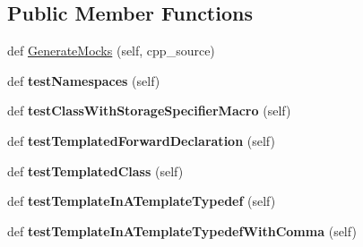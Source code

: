 \subsection*{Public Member Functions}
\begin{DoxyCompactItemize}
\item 
def \hyperlink{classcpp_1_1gmock__class__test_1_1GenerateMocksTest_afdce6749dca14c1aa90762d389d92c87}{Generate\+Mocks} (self, cpp\+\_\+source)
\item 
def {\bfseries test\+Namespaces} (self)\hypertarget{classcpp_1_1gmock__class__test_1_1GenerateMocksTest_a706812da9e8f79a689c707b4032db2d2}{}\label{classcpp_1_1gmock__class__test_1_1GenerateMocksTest_a706812da9e8f79a689c707b4032db2d2}

\item 
def {\bfseries test\+Class\+With\+Storage\+Specifier\+Macro} (self)\hypertarget{classcpp_1_1gmock__class__test_1_1GenerateMocksTest_aba1ab8ae8a897ea9c22a47bcd1524254}{}\label{classcpp_1_1gmock__class__test_1_1GenerateMocksTest_aba1ab8ae8a897ea9c22a47bcd1524254}

\item 
def {\bfseries test\+Templated\+Forward\+Declaration} (self)\hypertarget{classcpp_1_1gmock__class__test_1_1GenerateMocksTest_a18cb0f03ecd4e54d0f787694c1513731}{}\label{classcpp_1_1gmock__class__test_1_1GenerateMocksTest_a18cb0f03ecd4e54d0f787694c1513731}

\item 
def {\bfseries test\+Templated\+Class} (self)\hypertarget{classcpp_1_1gmock__class__test_1_1GenerateMocksTest_a4098c99b66f0cbea7be9e66352a20f4d}{}\label{classcpp_1_1gmock__class__test_1_1GenerateMocksTest_a4098c99b66f0cbea7be9e66352a20f4d}

\item 
def {\bfseries test\+Template\+In\+A\+Template\+Typedef} (self)\hypertarget{classcpp_1_1gmock__class__test_1_1GenerateMocksTest_a32a2840352d970c631d7be1b6d1970e6}{}\label{classcpp_1_1gmock__class__test_1_1GenerateMocksTest_a32a2840352d970c631d7be1b6d1970e6}

\item 
def {\bfseries test\+Template\+In\+A\+Template\+Typedef\+With\+Comma} (self)\hypertarget{classcpp_1_1gmock__class__test_1_1GenerateMocksTest_a67d1336b8782257fcfcdbda8c8d4f794}{}\label{classcpp_1_1gmock__class__test_1_1GenerateMocksTest_a67d1336b8782257fcfcdbda8c8d4f794}

\end{DoxyCompactItemize}


